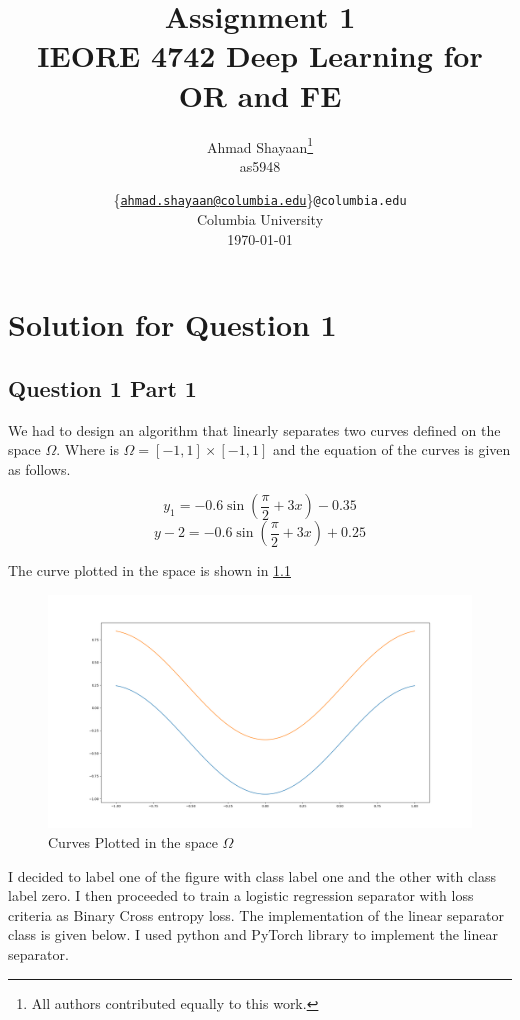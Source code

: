 \documentclass[12pt]{report}
\title{\Large{\textbf{Assignment 1}}\\\Large{IEORE 4742 Deep Learning for OR and FE}}
\author{
    Ahmad Shayaan\thanks{All authors contributed equally to this work.} \\as5948
    }
\date{
\{\href{mailto:ahmad.shayaan@columbia.edu}{\texttt{\small{ahmad.shayaan@columbia.edu}}}\}\texttt{\small{@columbia.edu}}\\
    Columbia University\\
    \today}
\begin{document}
\maketitle
\tableofcontents

\pagebreak

\chapter{Solution for Question 1}
\section{Question 1 Part 1}
We had to design an algorithm that linearly separates two curves defined on the space $\Omega$. Where is $\Omega = [-1,1] \times [-1,1]$ and the equation of the curves is given as follows.

\begin{equation*}
	y_1 = -0.6\sin{(\frac{\pi}{2} + 3x)} - 0.35 
\end{equation*}
\begin{equation*}
	y-2 = -0.6\sin{(\frac{\pi}{2} +3x)} + 0.25
\end{equation*}

\noindent The curve plotted in the space is shown in \figurename{\ref*{fig:1}}
\begin{figure}[H]
	\begin{center}
		\includegraphics[scale = 0.3]{"que1a_curve"}
		\caption{Curves Plotted in the space $\Omega$}
		\label{fig:1}
	\end{center}
\end{figure}

I decided to label one of the figure with class label one and the other with class label zero. I then proceeded to train a logistic regression separator with loss criteria as Binary Cross entropy loss. The implementation of the linear separator class is given below. I used python and PyTorch library to implement the linear separator.
\end{document}
